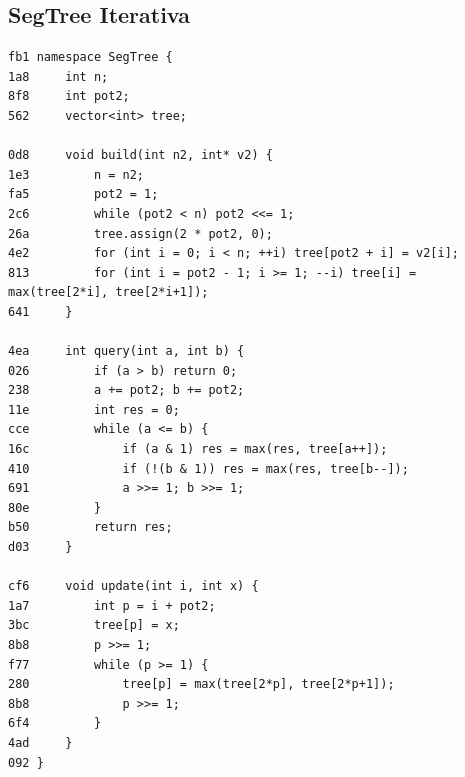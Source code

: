 \documentclass[11pt, a4paper, twoside]{article}
\begin{document}
\subsection{SegTree Iterativa}
\begin{lstlisting}
fb1 namespace SegTree {
1a8     int n;
8f8     int pot2;
562     vector<int> tree;
    
0d8     void build(int n2, int* v2) {
1e3         n = n2;
fa5         pot2 = 1;
2c6         while (pot2 < n) pot2 <<= 1;
26a         tree.assign(2 * pot2, 0);
4e2         for (int i = 0; i < n; ++i) tree[pot2 + i] = v2[i];
813         for (int i = pot2 - 1; i >= 1; --i) tree[i] = max(tree[2*i], tree[2*i+1]);
641     }
    
4ea     int query(int a, int b) {
026         if (a > b) return 0;
238         a += pot2; b += pot2;
11e         int res = 0;
cce         while (a <= b) {
16c             if (a & 1) res = max(res, tree[a++]);
410             if (!(b & 1)) res = max(res, tree[b--]);
691             a >>= 1; b >>= 1;
80e         }
b50         return res;
d03     }
    
cf6     void update(int i, int x) {
1a7         int p = i + pot2;
3bc         tree[p] = x;
8b8         p >>= 1;
f77         while (p >= 1) {
280             tree[p] = max(tree[2*p], tree[2*p+1]);
8b8             p >>= 1;
6f4         }
4ad     }
092 }
\end{lstlisting}
\end{document}
